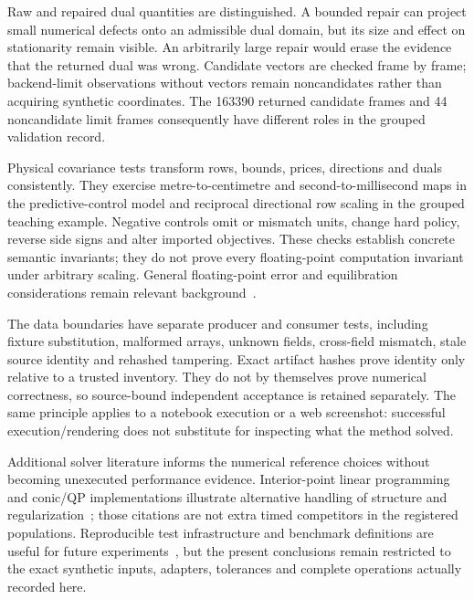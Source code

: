 Raw and repaired dual quantities are distinguished. A bounded repair can
project small numerical defects onto an admissible dual domain, but its size
and effect on stationarity remain visible. An arbitrarily large repair would
erase the evidence that the returned dual was wrong. Candidate vectors are
checked frame by frame; backend-limit observations without vectors remain
noncandidates rather than acquiring synthetic coordinates. The 163390 returned
candidate frames and 44 noncandidate limit frames consequently have different
roles in the grouped validation record.

Physical covariance tests transform rows, bounds, prices, directions and
duals consistently. They exercise metre-to-centimetre and second-to-millisecond
maps in the predictive-control model and reciprocal directional row scaling
in the grouped teaching example. Negative controls omit or mismatch units,
change hard policy, reverse side signs and alter imported objectives. These
checks establish concrete semantic invariants; they do not prove every
floating-point computation invariant under arbitrary scaling. General
floating-point error and equilibration considerations remain relevant
background~\cite{higham,knight}.

The data boundaries have separate producer and consumer tests, including
fixture substitution, malformed arrays, unknown fields, cross-field mismatch,
stale source identity and rehashed tampering. Exact artifact hashes prove
identity only relative to a trusted inventory. They do not by themselves
prove numerical correctness, so source-bound independent acceptance is
retained separately. The same principle applies to a notebook execution
or a web screenshot: successful execution/rendering does not substitute
for inspecting what the method solved.

Additional solver literature informs the numerical reference choices without
becoming unexecuted performance evidence. Interior-point linear programming
and conic/QP implementations illustrate alternative handling of structure
and regularization~\cite{vanderbei,piqp}; those citations are not extra timed
competitors in the registered populations. Reproducible test infrastructure
and benchmark definitions are useful for future experiments~\cite{cutest},
but the present conclusions remain restricted to the exact synthetic inputs,
adapters, tolerances and complete operations actually recorded here.
